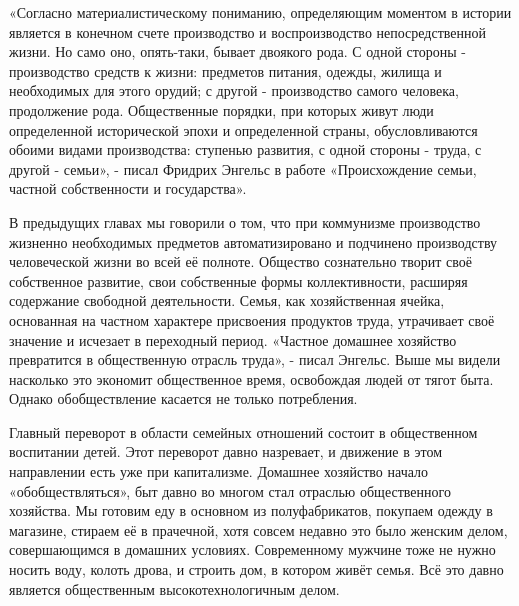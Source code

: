 \documentclass[12pt,a4paper,openany]{book}
\begin{document}
«Согласно материалистическому пониманию, определяющим моментом в истории является в конечном счете производство и воспроизводство непосредственной жизни. Но само оно, опять-таки, бывает двоякого рода. С одной стороны - производство средств к жизни: предметов питания, одежды, жилища и необходимых для этого орудий; с другой - производство самого человека, продолжение рода. Общественные порядки, при которых живут люди определенной исторической эпохи и определенной страны, обусловливаются обоими видами производства: ступенью развития, с одной стороны - труда, с другой - семьи», - писал Фридрих Энгельс в работе «Происхождение семьи, частной собственности и государства».

В предыдущих главах мы говорили о том, что при коммунизме производство жизненно необходимых предметов автоматизировано и подчинено производству человеческой жизни во всей её полноте. Общество сознательно творит своё собственное развитие, свои собственные формы коллективности, расширяя содержание свободной деятельности. Семья, как хозяйственная ячейка, основанная на частном характере присвоения продуктов труда, утрачивает своё значение и исчезает в переходный период. «Частное домашнее хозяйство превратится в общественную отрасль труда», - писал Энгельс. Выше мы видели насколько это экономит общественное время, освобождая людей от тягот быта. Однако обобществление касается не только потребления.

Главный переворот в области семейных отношений состоит в общественном воспитании детей. Этот переворот давно назревает, и движение в этом направлении есть уже при капитализме. Домашнее хозяйство начало «обобществляться», быт давно во многом стал отраслью общественного хозяйства. Мы готовим еду в основном из полуфабрикатов, покупаем одежду в магазине, стираем её в прачечной, хотя совсем недавно это было женским делом, совершающимся в домашних условиях. Современному мужчине тоже не нужно носить воду, колоть дрова, и строить дом, в котором живёт семья. Всё это давно является общественным высокотехнологичным делом.
\end{document}
